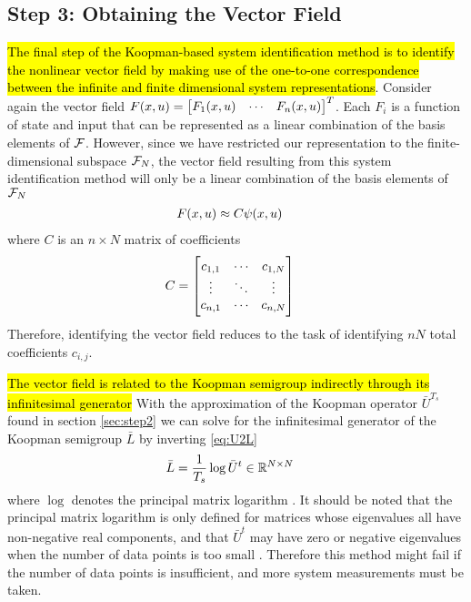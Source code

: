 \subsection{Step 3: Obtaining the Vector Field} \label{sec:step3}

\hl{The final step of the Koopman-based system identification method is to identify the nonlinear vector field by making use of the one-to-one correspondence between the infinite and finite dimensional system representations}.
Consider again the vector field $F(x,u)=\begin{bmatrix} F_1(x,u) & \cdots & F_n(x,u) \end{bmatrix}^T$.
Each $F_i$ is a function of state and input that can be represented as a linear combination of the basis elements of $\mathcal{F}$.
However, since we have restricted our representation to the finite-dimensional subspace $\mathcal{F}_N$, the vector field resulting from this system identification method will only be a linear combination of the basis elements of $\mathcal{F}_N$
\begin{align}
    F(x, u) &\approx C {\psi}(x, u)
    \label{eq:F2C}
\end{align}
where $C$ is an $n \times N$ matrix of coefficients
\begin{align}
    C &= \begin{bmatrix}  c_{1,1} & \cdots & c_{1,N} \\ \vdots & \ddots & \vdots \\ c_{n,1} & \cdots & c_{n,N}  \end{bmatrix}
    \label{eq:C}
\end{align}
Therefore, identifying the vector field reduces to the task of identifying $nN$ total coefficients $c_{i,j}$.

\hl{
The vector field is related to the Koopman semigroup indirectly through its infinitesimal generator
}
With the approximation of the Koopman operator $\bar{U}^{T_s}$ found in section \ref{sec:step2} we can solve for the infinitesimal generator of the Koopman semigroup $\bar{L}$ by inverting  \eqref{eq:U2L}
\begin{align}
    \bar{L} &= \frac{1}{T_s} \log{ \bar{U}^t } \in \mathbb{R}^{N \times N}
\end{align}
where $\log$ denotes the principal matrix logarithm \cite{higham2008functions} .
It should be noted that the principal matrix logarithm is only defined for matrices whose eigenvalues all have non-negative real components, and that $\bar{U}^t$ may have zero or negative eigenvalues when the number of data points is too small \cite{mauroy2016linear}.
Therefore this method might fail if the number of data points is insufficient, and more system measurements must be taken.

